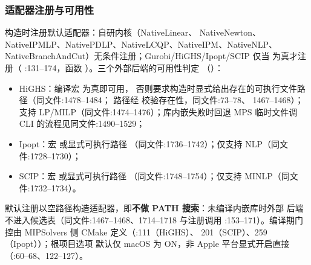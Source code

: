 \subsubsection*{适配器注册与可用性}
 构造时注册默认适配器：自研内核（NativeLinear、
NativeNewton、NativeIPMLP、NativePDLP、NativeLCQP、NativeIPM、NativeNLP、
NativeBranchAndCut）无条件注册；Gurobi/HiGHS/Ipopt/SCIP 仅当
 为真才注册（
:131--174，函数
）。三个外部后端的可用性判定
（）：
\begin{itemize}
  \item HiGHS：编译宏  为真即可用，
        否则要求构造时显式给出存在的可执行文件路径（同文件:1478--1484；
        路径经  校验存在性，同文件:73--78、
        1467--1468）；支持 LP/MILP（同文件:1474--1476）；库内嵌失败时回退
        MPS 临时文件调 CLI 的流程见同文件:1490--1529；
  \item Ipopt：宏  或显式可执行路径
        （同文件:1736--1742）；仅支持 NLP（同文件:1728--1730）；
  \item SCIP：宏  或显式可执行路径
        （同文件:1748--1754）；仅支持 MINLP（同文件:1732--1734）。
\end{itemize}
默认注册以空路径构造适配器，即\textbf{不做 PATH 搜索}：未编译内嵌库时外部
后端不进入候选表（同文件:1467--1468、1714--1718 与注册调用
:153--171）。编译期门控由
MIPSolvers 侧 CMake 定义（:111（HiGHS）、
201（SCIP）、259（Ipopt））；根项目选项 
默认仅 macOS 为 ON，非 Apple 平台显式开启直接
（:60--68、122--127）。

